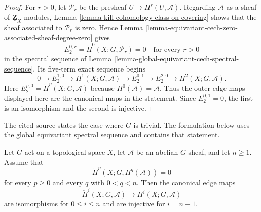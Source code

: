 \begin{proof}
For $r>0$, let $\mathcal P_r$ be the presheaf
$U\mapsto H^r(U,\mathcal A)$. Regarding $\mathcal A$ as a sheaf of
$\underline{\mathbf Z}_X$-modules, Lemma
\ref{lemma-kill-cohomology-class-on-covering} shows that the sheaf
associated to $\mathcal P_r$ is zero. Hence Lemma
\ref{lemma-equivariant-cech-zero-associated-sheaf-degree-zero} gives
$$
E_2^{0,r}=\check H^0(X;G,\mathcal P_r)=0
\quad\text{for every }r>0
$$
in the spectral sequence of Lemma
\ref{lemma-global-equivariant-cech-spectral-sequence}. Its five-term
exact sequence begins
$$
0\longrightarrow E_2^{1,0}\longrightarrow H^1(X;G,\mathcal A)
\longrightarrow E_2^{0,1}\longrightarrow E_2^{2,0}
\longrightarrow H^2(X;G,\mathcal A).
$$
Here $E_2^{p,0}=\check H^p(X;G,\mathcal A)$ because
$\underline H^0(\mathcal A)=\mathcal A$. Thus the outer edge maps
displayed here are the canonical maps in the statement. Since
$E_2^{0,1}=0$, the first is an isomorphism and the second is injective.
\end{proof}


\begin{lemma}
\label{lemma-global-equivariant-cech-edge-range}
\begin{reference}
\cite[Chapter III, \S 3.8, paragraph following
Corollary 3.8.1(3), p. 176]{Tohoku}
\end{reference}
\begin{history}
The cited source states the case where $G$ is trivial. The formulation below
uses the global equivariant spectral sequence and contains that statement.
\end{history}
Let $G$ act on a topological space $X$, let $\mathcal A$ be an abelian
$G$-sheaf, and let $n \geq 1$. Assume that
$$
\check H^p(X;G,\underline H^q(\mathcal A))=0
$$
for every $p \geq 0$ and every $q$ with $0 < q < n$. Then the canonical
edge maps
$$
\check H^i(X;G,\mathcal A)
\longrightarrow
H^i(X;G,\mathcal A)
$$
are isomorphisms for $0 \leq i \leq n$ and are injective for $i=n+1$.
\end{lemma}

